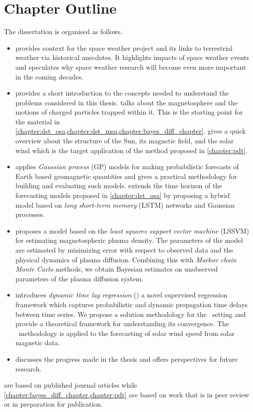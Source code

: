 \section{Chapter Outline}

The dissertation is organised as follows.

\begin{itemize}
    \item {} provides context for the space weather project and its 
    links to terrestrial weather via historical anecdotes. It highlights impacts of space weather 
    events and speculates why space weather research will become even more important in the coming 
    decades.

    \item {} provides a short introduction to the concepts needed 
    to understand the problems considered in this thesis.  talks about the 
    magnetosphere and the motions of charged particles trapped within it. This is the starting 
    point for the material in \cref{chapter:dst_osa,chapter:dst_msa,chapter:bayes_diff_chapter}. 
     gives a quick overview about the structure of the Sun, its magnetic field, 
    and the solar wind which is the target application of the method proposed in \cref{chapter:pdt}.
    
    \item {} applies \emph{Gaussian process} (GP) models for making 
    probabilistic forecasts of Earth based geomagnetic quantities and gives a practical methodology 
    for building and evaluating such models.  extends the time horizon of the 
    forecasting models proposed in \cref{chapter:dst_osa} by proposing a hybrid model based on 
    \emph{long short-term memory} (LSTM) networks and Gaussian processes.
    
    \item {} proposes a model based on the 
    \emph{least squares support vector machine} (LSSVM) for estimating magnetospheric plasma 
    density. The parameters of the model are estimated by minimizing error with respect to observed 
    data and the physical dynamics of plasma diffusion. Combining this with 
    \emph{Markov chain Monte Carlo} methods, we obtain Bayesian estimates on unobserved 
    parameters of the plasma diffusion system.   
    
    \item {} introduces \emph{dynamic time lag regression} (\XX) a novel 
    supervised regression framework which captures probabilistic and dynamic propagation time 
    delays between time series. We propose a solution methodology for the \XX \ setting and provide 
    a theoretical framework for understanding its convergence. The \XX \ methodology is applied to 
    the forecasting of solar wind speed from solar magnetic data. 
    
    \item {} discusses the progress made in the thesis and offers 
    perspectives for future research.
\end{itemize}


 are based on published journal articles 
while \cref{chapter:bayes_diff_chapter,chapter:pdt} are based on work that is in peer review or in 
preparation for publication.  
